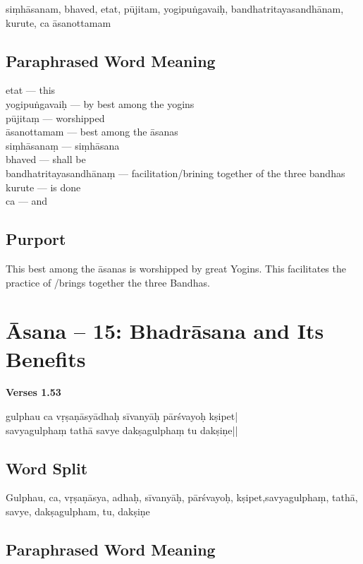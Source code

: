 siṃhāsanam,  bhaved, etat, pūjitam, yogipuṅgavaiḥ, bandhatritayasandhānam, kurute, ca āsanottamam

\subsection*{Paraphrased Word Meaning}

\begin{multicols}{2}
etat ---  this \\
yogipuṅgavaiḥ --- by best among the yogins   \\
pūjitaṃ ---  worshipped  \\
āsanottamam --- best among the āsanas \\
siṃhāsanaṃ ---  siṃhāsana \\
bhaved ---   shall be   \\
bandhatritayasandhānaṃ --- facilitation/brining together of the three bandhas   \\
kurute ---  is done  \\
ca --- and
\end{multicols}

\subsection*{Purport}

This best among the āsanas is worshipped by great Yogins. This facilitates the practice of /brings together the three Bandhas.
\newpage

\section*{Āsana -- 15: Bhadrāsana and Its Benefits}

\noindent \textbf{Verses 1.53}

\begin{shloka}
gulphau ca vṛṣaṇāsyādhaḥ sīvanyāḥ pārśvayoḥ kṣipet|\\
savyagulphaṃ tathā savye dakṣagulphaṃ tu dakṣiṇe||
\end{shloka}

\subsection*{Word Split}

Gulphau, ca, vṛṣaṇāsya, adhaḥ, sīvanyāḥ, pārśvayoḥ, kṣipet,savyagulphaṃ, tathā, savye, dakṣagulpham, tu, dakṣiṇe

\subsection*{Paraphrased Word Meaning}

